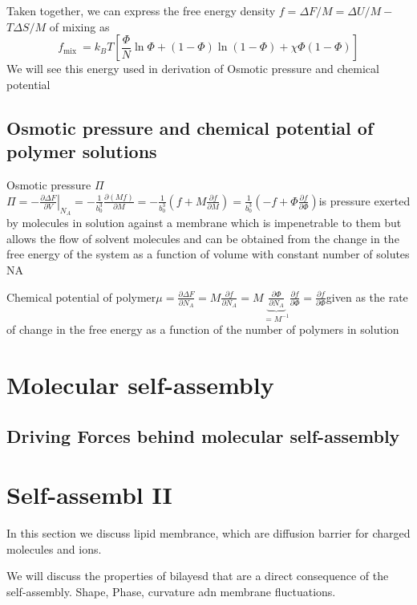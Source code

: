 \documentclass[12pt,a4paper]{article}
\begin{document}
Taken together, we can express the free energy density $f=\Delta F / M=\Delta U / M-$ $T \Delta S / M$ of mixing as
$$
f_{\text {mix }}=k_B T\left[\frac{\Phi}{N} \ln \Phi+(1-\Phi) \ln (1-\Phi)+\chi \Phi(1-\Phi)\right]
$$
We will see this energy used in derivation of Osmotic pressure and chemical potential
\subsection{Osmotic pressure and chemical potential of polymer solutions}
\begin{definition}
    {Osmotic pressure $\Pi$}{$\Pi=-\left.\frac{\partial \Delta F}{\partial V}\right|_{N_A}=-\frac{1}{b_0^3} \frac{\partial(M f)}{\partial M}=-\frac{1}{b_0^3}\left(f+M \frac{\partial f}{\partial M}\right)=\frac{1}{b_0^3}\left(-f+\Phi \frac{\partial f}{\partial \Phi}\right)$}{is pressure exerted by molecules in solution against a membrane which is impenetrable to them but allows the flow of solvent molecules and can be obtained from the change in the free energy of the system as a function of volume with constant number of solutes NA}
\end{definition}

\begin{definition}
    {Chemical potential of polymer}{$\mu=\frac{\partial \Delta F}{\partial N_A}=M \frac{\partial f}{\partial N_A}=M \underbrace{\frac{\partial \Phi}{\partial N_A}}_{=M^{-1}} \frac{\partial f}{\partial \Phi}=\frac{\partial f}{\partial \Phi}$}{given as the rate of change in the free energy as a function of the number of polymers in solution}
\end{definition}
\section{Molecular self-assembly}
\subsection{Driving Forces behind molecular self-assembly}
\section{Self-assembl II}
In this section we discuss lipid membrance, which are diffusion barrier for charged molecules and ions.

We will discuss the properties of bilayesd that are a direct consequence of the self-assembly. Shape, Phase, curvature adn membrane fluctuations.
\end{document}
